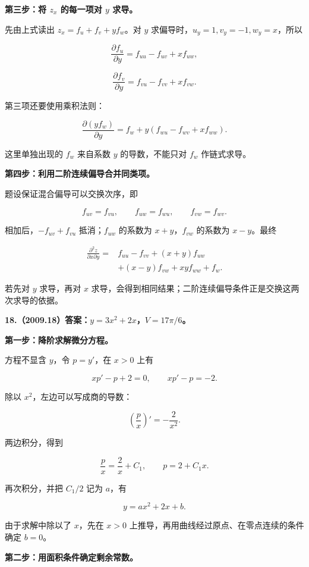 \documentclass[UTF8,11pt,fontset=windows]{ctexart}
\begin{document}
\textbf{第三步：将 $z_x$ 的每一项对 $y$ 求导。}

先由上式读出 $z_x=f_u+f_v+yf_w$。对 $y$ 求偏导时，$u_y=1,v_y=-1,w_y=x$，所以

$$
\frac{\partial f_u}{\partial y}=f_{uu}-f_{uv}+xf_{uw},
$$

$$
\frac{\partial f_v}{\partial y}=f_{vu}-f_{vv}+xf_{vw}.
$$

第三项还要使用乘积法则：

$$
\frac{\partial(yf_w)}{\partial y}
=f_w+y(f_{wu}-f_{wv}+xf_{ww}).
$$

这里单独出现的 $f_w$ 来自系数 $y$ 的导数，不能只对 $f_w$ 作链式求导。

\textbf{第四步：利用二阶连续偏导合并同类项。}

题设保证混合偏导可以交换次序，即

$$
f_{uv}=f_{vu},\qquad f_{uw}=f_{wu},\qquad f_{vw}=f_{wv}.
$$

相加后，$-f_{uv}+f_{vu}$ 抵消；$f_{uw}$ 的系数为 $x+y$，$f_{vw}$ 的系数为 $x-y$。最终

$$
\boxed{\begin{aligned}
\frac{\partial^2z}{\partial x\partial y}
={}&f_{uu}-f_{vv}+(x+y)f_{uw}\\
&+(x-y)f_{vw}+xyf_{ww}+f_w.
\end{aligned}}
$$

若先对 $y$ 求导，再对 $x$ 求导，会得到相同结果；二阶连续偏导条件正是交换这两次求导的依据。

\clearpage

\textbf{18.（2009.18）答案：$y=3x^2+2x$，$V=17\pi/6$。}

\textbf{第一步：降阶求解微分方程。}

方程不显含 $y$，令 $p=y'$，在 $x>0$ 上有

$$
xp'-p+2=0,
\qquad xp'-p=-2.
$$

除以 $x^2$，左边可以写成商的导数：

$$
\left(\frac px\right)'=-\frac2{x^2}.
$$

两边积分，得到

$$
\frac px=\frac2x+C_1,
\qquad p=2+C_1x.
$$

再次积分，并把 $C_1/2$ 记为 $a$，有

$$
y=ax^2+2x+b.
$$

由于求解中除以了 $x$，先在 $x>0$ 上推导，再用曲线经过原点、在零点连续的条件确定 $b=0$。

\textbf{第二步：用面积条件确定剩余常数。}
\end{document}
